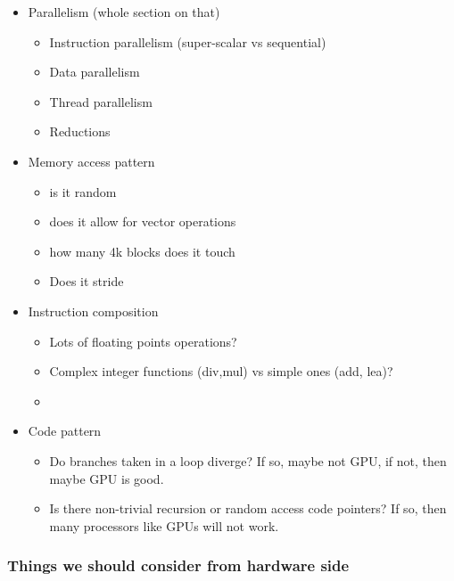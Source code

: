 \documentclass[12pt,twoside]{reedthesis}
\begin{document}
	\begin{itemize}
		\item Parallelism  (whole section on that)
			\begin{itemize}
			\item Instruction parallelism (super-scalar vs sequential)
			\item Data parallelism
			\item Thread parallelism
			\item Reductions
			\end{itemize}

		\item Memory access pattern
			\begin{itemize}
			\item is it random
			\item does it allow for vector operations
			\item how many 4k blocks does it touch
			\item Does it stride
			\end{itemize}

		\item Instruction composition
			\begin{itemize}
			\item Lots of floating points operations?
			\item Complex integer functions (div,mul) vs simple ones (add, lea)?
			\item
			\end{itemize}

		\item Code pattern
			\begin{itemize}
			\item Do branches taken in a loop diverge? If so, maybe not GPU, if not, then maybe GPU is good.
			\item Is there non-trivial recursion or random access code pointers? If so, then many processors like GPUs will not work.
			\end{itemize}

	\end{itemize}


	\subsubsection{Things we should consider from hardware side}
\end{document}
